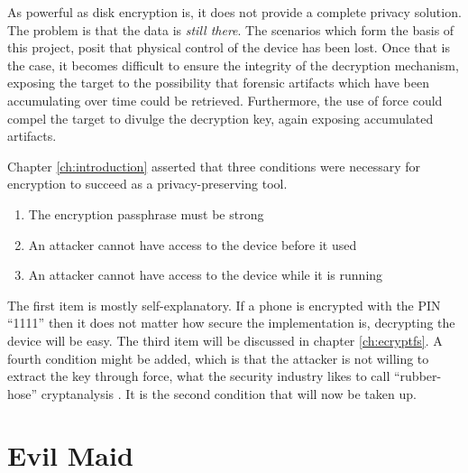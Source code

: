 As powerful as disk encryption is, it does not provide a complete privacy solution. The problem is that the data is
\emph{still there}.  The scenarios which form the basis of this project, posit that physical control of the device has been lost.
Once that is the case, it becomes difficult to ensure the integrity of the decryption mechanism, exposing the target to the
possibility that forensic artifacts which have been accumulating over time could be retrieved.  Furthermore, the use of force could
compel the target to divulge the decryption key, again exposing accumulated artifacts. 

Chapter \ref{ch:introduction} asserted that three conditions were necessary for encryption to succeed as a privacy-preserving tool.
\begin{enumerate}
	\item{The encryption passphrase must be strong}
	\item{An attacker cannot have access to the device before it used}
	\item{An attacker cannot have access to the device while it is running}
\end{enumerate}
The first item is mostly self-explanatory. If a phone is encrypted with the PIN ``1111'' then it does not matter how secure the
implementation is, decrypting the device will be easy. The third item will be discussed in chapter \ref{ch:ecryptfs}. A fourth
condition might be added, which is that the attacker is not willing to extract the key through force, what the security industry
likes to call ``rubber-hose'' cryptanalysis \cite{rubberhose}. It is the second condition that will now be taken up. 

\section{Evil Maid}

